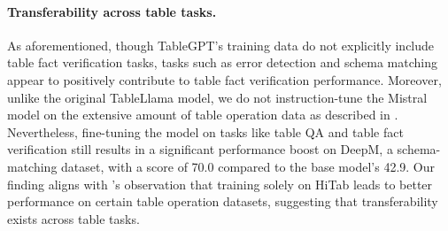 \documentclass[11pt]{article}
\begin{document}
\paragraph{Transferability across table tasks.}
As aforementioned, though TableGPT's training data do not explicitly include table fact verification tasks, tasks such as error detection and schema matching appear to positively contribute to table fact verification performance.
Moreover, unlike the original TableLlama model, we do not instruction-tune the Mistral model on the extensive amount of table operation data as described in .
Nevertheless, fine-tuning the model on tasks like table QA and table fact verification still results in a significant performance boost on DeepM, a schema-matching dataset, with a score of 70.0 compared to the base model's 42.9.
Our finding aligns with \citet{zhang-etal-2024-tablellama}'s observation that training solely on HiTab leads to better performance on certain table operation datasets, suggesting that transferability exists across table tasks.

\end{document}
